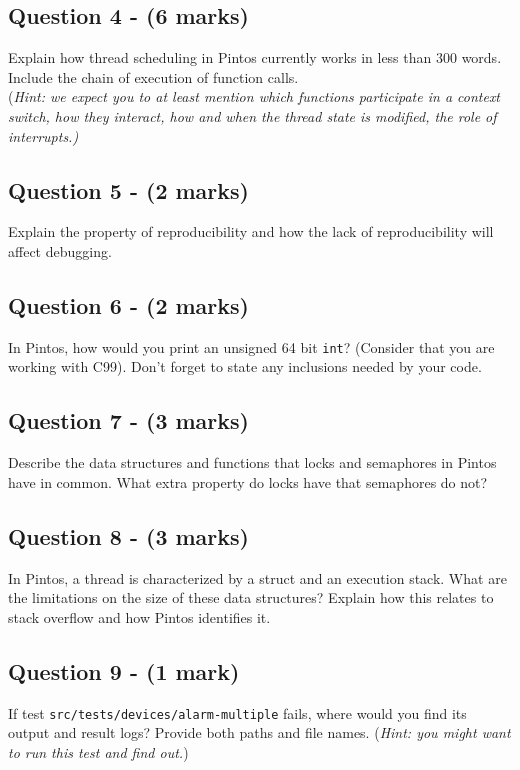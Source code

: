 \documentclass[a4paper,12pt]{article}
\begin{document}
\subsection*{Question 4 - (6 marks)}
Explain how thread scheduling in Pintos currently works in less than 300 words. 
Include the chain of execution of function calls. \\
(\textit{Hint: we expect you to at least mention which functions participate in a context switch, how they interact, how and when the thread state is modified, the role of interrupts.)}

\subsection*{Question 5 - (2 marks)}
Explain the property of reproducibility and how the lack of reproducibility will affect debugging.

\subsection*{Question 6 - (2 marks)}
In Pintos, how would you print an unsigned 64 bit \texttt{int}? 
(Consider that you are working with C99). 
Don't forget to state any inclusions needed by your code.

\subsection*{Question 7 - (3 marks)}
Describe the data structures and functions that locks and semaphores in Pintos have in common. 
What extra property do locks have that semaphores do not?

\subsection*{Question 8 - (3 marks)}
In Pintos, a thread is characterized by a struct and an execution stack. 
What are the limitations on the size of these data structures? 
Explain how this relates to stack overflow and how Pintos identifies it.

\subsection*{Question 9 - (1 mark)}
If test \texttt{src/tests/devices/alarm-multiple} fails, where would you find its output and result logs? 
Provide both paths and file names.
(\textit{Hint: you might want to run this test and find out.}) 
\end{document}
